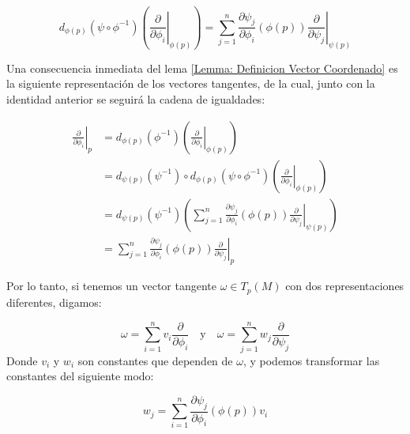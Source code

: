\[
	d_{\phi(p)}(\psi \circ \phi^{-1}) \left( \left. \frac{\partial}{\partial \phi_{i}} \right|_{\phi(p)} \right) = \sum_{j=1}^{n}\frac{\partial \psi_j}{\partial \phi_i} (\phi(p)) \left. \frac{\partial}{\partial \psi_{j}} \right|_{\psi(p)}
\]

Una consecuencia inmediata del lema \ref{Lemma: Definicion Vector Coordenado} es la siguiente representación de los vectores tangentes, de la cual, junto con la identidad anterior se seguirá la cadena de igualdades:

\begin{align*}
	\left. \frac{\partial}{\partial \phi_i}\right|_{p}
	 & =
	d_{\phi(p)} \left(\phi^{-1}\right)
	\left(\left.
	\frac{\partial}{\partial \phi_i}
	\right|_{\phi(p)}\right)                                            \\
	 & =
	d_{\psi(p)}(\psi^{-1}) \circ d_{\phi(p)}\left(\psi \circ \phi^{-1}\right)
	\left( \left.
	\frac{\partial}{\partial \phi_i}
	\right|_{\phi(p)}\right)                                            \\
	 & =
	d_{\psi(p)}(\psi^{-1}) \left(
	\sum_{j=1}^{n}\frac{\partial \psi_j}{\partial \phi_i}(\phi(p))
	\left.
	\frac{\partial}{\partial \psi_j}
	\right|_{\psi(p)} \right)                                           \\
	 & = \sum_{j=1}^{n}\frac{\partial \psi_j}{\partial \phi_i}(\phi(p))
	\left.
	\frac{\partial}{\partial \psi_j}
	\right|_{p}
\end{align*}

Por lo tanto, si tenemos un vector tangente $\omega \in T_p(M)$ con dos representaciones diferentes, digamos:

\[
	\omega = \sum_{i=1}^{n} v_i \frac{\partial}{\partial \phi_i}
	\quad \text{y} \quad
	\omega = \sum_{j=1}^{n} w_j \frac{\partial}{\partial \psi_j}
\]
Donde $v_i$ y $w_i$ son constantes que dependen de $\omega$, y podemos transformar las constantes del siguiente modo:

\[
	w_j = \sum_{i=1}^{n} \frac{\partial \psi_j}{\partial \phi_i} (\phi(p)) v_i
\]

